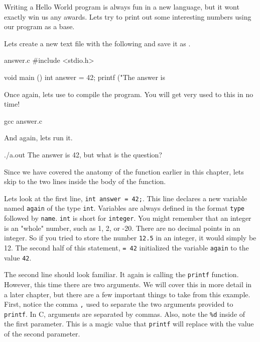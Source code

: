 Writing a Hello World program is always fun in a new language, but it wont
exactly win us any awards. Lets try to print out some interesting numbers
using our program as a base.

Lets create a new text file with the following and save it as .

\begin{code}{answer.c}
#include <stdio.h>

void main ()
{
    int answer = 42;
    printf ("The answer is %
}
\end{code}

Once again, lets use  to compile the program. You will get very
used to this in no time!

\begin{Terminal}
gcc answer.c
\end{Terminal}

And again, lets run it.

\begin{Terminal}
./a.out
The answer is 42, but what is the question?
\end{Terminal}

Since we have covered the anatomy of the  function earlier in this
chapter, lets skip to the two lines inside the body of the function.

Lets look at the first line, \verb|int answer = 42;|. This line declares a new
variable named \verb|again| of the type \verb|int|. Variables are always
defined in the format \verb|type| followed by \verb|name|. \verb|int| is short
for \verb|integer|.  You might remember that an integer is an "whole" number,
such as 1, 2, or -20.  There are no decimal points in an integer. So if you
tried to store the number \verb|12.5| in an integer, it would simply be 12. The
second half of this statement, \verb|= 42| initialized the variable
\verb|again| to the value \verb|42|.

The second line should look familiar. It again is calling the \verb|printf|
function. However, this time there are two arguments. We will cover this in
more detail in a later chapter, but there are a few important things to take
from this example. First, notice the comma \verb|,| used to separate the
two arguments provided to \verb|printf|. In C, arguments are separated by
commas. Also, note the \verb|%d| inside of the first parameter. This is a
magic value that \verb|printf| will replace with the value of the second
parameter.

